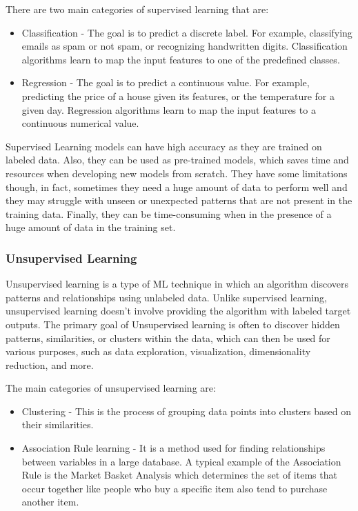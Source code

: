 There are two main categories of supervised learning that are:
\begin{itemize}
    \item Classification - The goal is to predict a discrete label.
    For example, classifying emails as spam or not spam, or recognizing handwritten digits.
    Classification algorithms learn to map the input features to one of the predefined classes.

    \item Regression - The goal is to predict a continuous value.
    For example, predicting the price of a house given its features, or the temperature for a given day.
    Regression algorithms learn to map the input features to a continuous numerical value.

\end{itemize}

Supervised Learning models can have high accuracy as they are trained on labeled data. Also, they can be used as pre-trained models, which saves time and resources when developing new models from scratch.
They have some limitations though, in fact, sometimes they need a huge amount of data to perform well and they may struggle with unseen or unexpected patterns that are not present in the training data. Finally, they can be time-consuming when in the presence of a huge amount of data in the training set.

\subsubsection{Unsupervised Learning}
\label{subsubsec:unsupervised_ml}
Unsupervised learning is a type of ML technique in which an algorithm discovers patterns and relationships using unlabeled data.
Unlike supervised learning, unsupervised learning doesn’t involve providing the algorithm with labeled target outputs.
The primary goal of Unsupervised learning is often to discover hidden patterns, similarities, or clusters within the data, which can then be used for various purposes, such as data exploration, visualization, dimensionality reduction, and more.


The main categories of unsupervised learning are:
\begin{itemize}
    \item Clustering - This is the process of grouping data points into clusters based on their similarities.

    \item Association Rule learning - It is a method used for finding relationships between variables in a large database. A typical example of the Association Rule is the Market Basket Analysis which determines the set of items that occur together like people who buy a specific item also tend to purchase another item.

\end{itemize}


